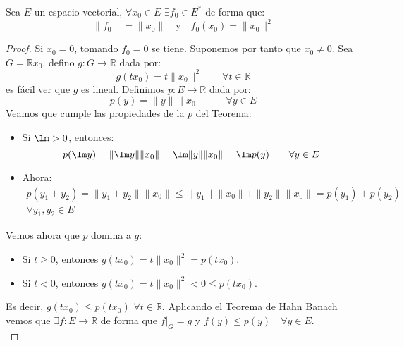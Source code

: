 \begin{coro}\label{coro:existencia_f0}
    Sea $E$ un espacio vectorial, $\forall x_0\in E$ $\exists f_0\in E^\ast$ de forma que:
    \begin{equation*}
        \|f_0\| = \|x_0\| \quad \text{y} \quad  f_0(x_0)= \|x_0\|^2
    \end{equation*}
    \begin{proof}
        Si $x_0 = 0$, tomando $f_0 = 0$ se tiene. Suponemos por tanto que $x_0\neq 0$. Sea $G = \mathbb{R} x_0$, defino $g:G\to \mathbb{R}$ dada por:
            \begin{equation*}
                g(tx_0) = t\|x_0\|^2 \qquad \forall t\in \mathbb{R}
            \end{equation*}
            es fácil ver que $g$ es lineal. Definimos $p:E\to \mathbb{R}$ dada por:
            \begin{equation*}
                p(y) = \|y\| \|x_0\| \qquad \forall y\in E
            \end{equation*}
            Veamos que cumple las propiedades de la $p$ del Teorema:
            \begin{itemize}
                \item Si $\lm > 0$, entonces:
                    \begin{equation*}
                        p(\lm y) = \|\lm y\|\|x_0\| = \lm \|y\| \|x_0\| = \lm p(y) \qquad \forall y\in E
                    \end{equation*}
                \item Ahora:
                    \begin{multline*}
                        p(y_1+y_2) = \|y_1+y_2\|\|x_0\| \leq \|y_1\|\|x_0\| + \|y_2\|\|x_0\| = p(y_1) + p(y_2) \\ \forall y_1,y_2\in E
                    \end{multline*}
            \end{itemize}
            Vemos ahora que $p$ domina a $g$:
            \begin{itemize}
                \item Si $t\geq 0$, entonces $g(tx_0) = t\|x_0\|^2 = p(tx_0)$.
                \item Si $t<0$, entonces $g(tx_0) = t\|x_0\|^2<0 \leq p(tx_0)$.
            \end{itemize}
            Es decir, $g(tx_0)\leq p(tx_0)$ $\forall t\in \mathbb{R}$. Aplicando el Teorema de Hahn Banach vemos que $\exists f:E\to \mathbb{R}$ de forma que $f\big|_G = g$ y $f(y)\leq p(y)\quad \forall y\in E$.\\


\end{proof}
\end{coro}
